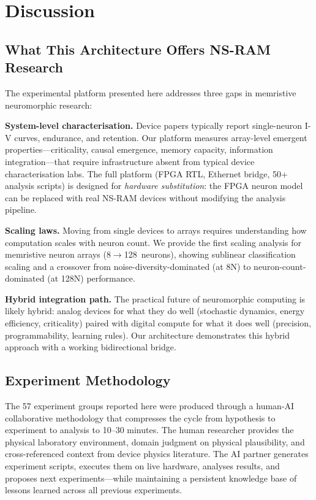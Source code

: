\documentclass[11pt]{article}
\begin{document}
\section{Discussion}
\label{sec:discussion}

\subsection{What This Architecture Offers NS-RAM Research}

The experimental platform presented here addresses three gaps
in memristive neuromorphic research:

\textbf{System-level characterisation.}
Device papers typically report single-neuron I-V curves,
endurance, and retention.  Our platform measures array-level
emergent properties---criticality, causal emergence, memory
capacity, information integration---that require
infrastructure absent from typical device characterisation
labs.  The full platform (FPGA RTL, Ethernet bridge, 50+
analysis scripts) is designed for \emph{hardware substitution}:
the FPGA neuron model can be replaced with real NS-RAM devices
without modifying the analysis pipeline.

\textbf{Scaling laws.}
Moving from single devices to arrays requires understanding
how computation scales with neuron count.  We provide the
first scaling analysis for memristive neuron arrays
(8$\to$128~neurons), showing sublinear classification
scaling and a crossover from noise-diversity-dominated (at 8N)
to neuron-count-dominated (at 128N) performance.

\textbf{Hybrid integration path.}
The practical future of neuromorphic computing is likely
hybrid: analog devices for what they do well (stochastic
dynamics, energy efficiency, criticality) paired with digital
compute for what it does well (precision, programmability,
learning rules).  Our architecture demonstrates this hybrid
approach with a working bidirectional bridge.

\subsection{Experiment Methodology}

The 57 experiment groups reported here were produced through
a human-AI collaborative methodology that compresses the
cycle from hypothesis to experiment to analysis to 10--30
minutes.  The human researcher provides the physical
laboratory environment, domain judgment on physical
plausibility, and cross-referenced context from device physics
literature.  The AI partner generates experiment scripts,
executes them on live hardware, analyses results, and
proposes next experiments---while maintaining a persistent
knowledge base of lessons learned across all previous
experiments.
\end{document}
